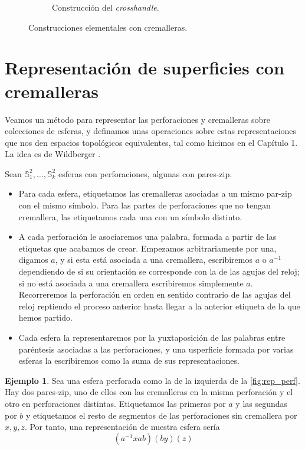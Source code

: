 \documentclass[10pt]{report}
\newcommand{\Esfera}{\mathbb{S}^2}
\theoremstyle{definition}
\newtheorem{eje}[defin]{Ejemplo}
\begin{document}
\begin{figure}
\begin{subfigure}{1\textwidth}
\caption{Construcción del \textit{crosshandle}.\label{fig:crosshandle}}
\end{subfigure}
\caption{Construcciones elementales con cremalleras.}
\end{figure}



\section{Representación de superficies con cremalleras}
Veamos un método para representar las perforaciones y cremalleras sobre colecciones de esferas, y definamos unas operaciones sobre estas representaciones que nos den espacios topológicos equivalentes, tal como hicimos en el Capítulo 1. La idea es de Wildberger \cite{wildberger}.

Sean $\Esfera_1,\dots ,\Esfera_k$ esferas con perforaciones, algunas con pares-zip. 
\begin{itemize}

\item Para cada esfera, etiquetamos las cremalleras asociadas a un mismo par-zip con el mismo símbolo. Para las partes de perforaciones que no tengan cremallera, las etiquetamos cada una con un símbolo distinto. 
\item A cada perforación le asociaremos una palabra, formada a partir de las etiquetas que acabamos de crear. Empezamos arbitrariamente por una, digamos $a$, y si esta está asociada a una cremallera, escribiremos $a$ o $a^{-1}$ dependiendo de si su orientación se corresponde con la de las agujas del reloj; si no está asociada a una cremallera escribiremos simplemente $a$. Recorreremos la perforación en orden en sentido contrario de las agujas del reloj reptiendo el proceso anterior hasta llegar a la anterior etiqueta de la que hemos partido.
\item Cada esfera la representaremos por la yuxtaposición de las palabras entre paréntesis asociadas a las perforaciones, y una usperficie formada por varias esferas la escribiremos como la suma de sus representaciones.
\end{itemize}
\begin{eje}\label{eje:rep_perf}
Sea una esfera perforada como la de la izquierda de la \autoref{fig:rep_perf}. Hay dos pares-zip, uno de ellos con las cremalleras en la misma perforación y el otro en perforaciones distintas. Etiquetamos las primeras por $a$ y las segundas por $b$ y etiquetamos el resto de segmentos de las perforaciones sin cremallera por $x,y,z$. Por tanto, una representación de nuestra esfera sería $$(a^{-1}xab)(by)(z)$$
\end{eje}
\end{document}
